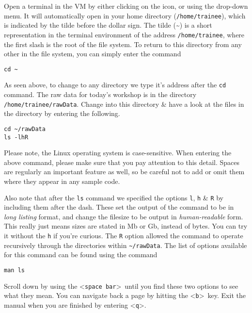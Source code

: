 \begin{steps}
Open a terminal in the VM by either clicking on the icon, or using the drop-down menu.
It will automatically open in your home directory (\texttt{/home/trainee}), which is indicated by the tilde before the dollar sign.
The tilde (\~{}) is a short representation in the terminal environment of the address \texttt{/home/trainee}, where the first slash is the root of the file system.
To return to this directory from any other in the file system, you can simply enter the command
\begin{lstlisting}
cd ~
\end{lstlisting}

As seen above, to change to any directory we type it's address after the \texttt{cd} command.
The raw data for today's workshop is in the directory \texttt{/home/trainee/rawData}.
Change into this directory \& have a look at the files in the directory by entering the following.
\begin{lstlisting}
cd ~/rawData
ls -lhR
\end{lstlisting}
\end{steps}

\begin{warning}
Please note, the Linux operating system is case-sensitive.
When entering the above command, please make sure that you pay
attention to this detail.
Spaces are regularly an important feature as well, so be careful not
to add or omit them where they appear in any sample code.
\end{warning}

Also note that after the \texttt{ls} command we specified the options \texttt{l}, \texttt{h} \& \texttt{R} by including them after the dash.
These set the output of the command to be in \textit{long listing} format, and change the filesize to be output in \textit{human-readable} form.
This really just means sizes are stated in Mb or Gb, instead of bytes.
You can try it without the \texttt{h} if you're curious.
The \texttt{R} option allowed the command to operate recursively through the directories within \texttt{\~{}/rawData}.
The list of options available for this command can be found using the command
\begin{lstlisting}
man ls
\end{lstlisting}
Scroll down by using the \textless \texttt{space bar}\textgreater \ until you find these two options to see what they mean.
You can navigate back a page by hitting the \textless \texttt{b}\textgreater \ key.
Exit the manual when you are finished by entering \textless \texttt{q}\textgreater.